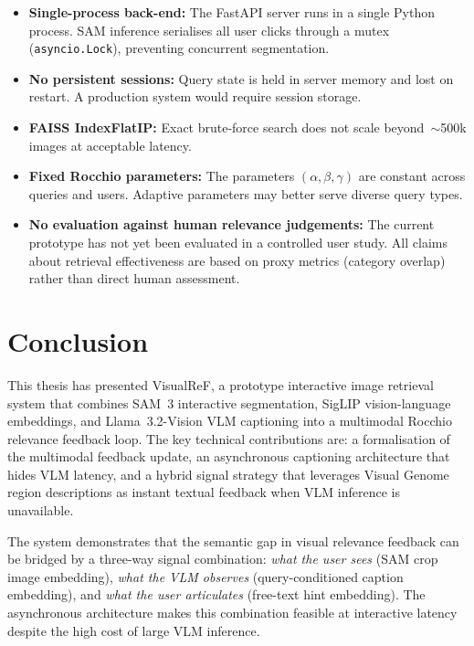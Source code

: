 \documentclass[12pt,a4paper]{article}
\begin{document}
\begin{itemize}[leftmargin=1.5em]
  \item \textbf{Single-process back-end:} The FastAPI server runs in a single
        Python process. SAM inference serialises all user clicks through a
        mutex (\texttt{asyncio.Lock}), preventing concurrent segmentation.
  \item \textbf{No persistent sessions:} Query state is held in server memory
        and lost on restart. A production system would require session storage.
  \item \textbf{FAISS IndexFlatIP:} Exact brute-force search does not scale
        beyond~$\sim$500k images at acceptable latency.
  \item \textbf{Fixed Rocchio parameters:} The parameters $(\alpha, \beta,
        \gamma)$ are constant across queries and users. Adaptive parameters
        may better serve diverse query types.
  \item \textbf{No evaluation against human relevance judgements:}
        The current prototype has not yet been evaluated in a controlled user
        study. All claims about retrieval effectiveness are based on proxy
        metrics (category overlap) rather than direct human assessment.
\end{itemize}

\section{Conclusion}
\label{sec:conclusion}

This thesis has presented VisualReF, a prototype interactive image retrieval
system that combines SAM~3 interactive segmentation, SigLIP vision-language
embeddings, and Llama~3.2-Vision VLM captioning into a multimodal Rocchio
relevance feedback loop. The key technical contributions are: a formalisation
of the multimodal feedback update, an asynchronous captioning architecture
that hides VLM latency, and a hybrid signal strategy that leverages Visual
Genome region descriptions as instant textual feedback when VLM inference is
unavailable.

The system demonstrates that the semantic gap in visual relevance feedback
can be bridged by a three-way signal combination: \emph{what the user sees}
(SAM crop image embedding), \emph{what the VLM observes} (query-conditioned
caption embedding), and \emph{what the user articulates} (free-text hint
embedding). The asynchronous architecture makes this combination feasible at
interactive latency despite the high cost of large VLM inference.
\end{document}
